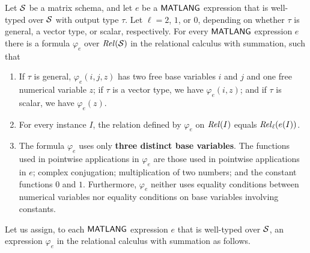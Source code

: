 \begin{proposition} 
Let $\mathcal{S}$ be a matrix schema, and let $e$ be a $\mathsf{MATLANG}$ expression
that is well-typed over $\mathcal{S}$ with output type $\tau$.
Let $\ell=2$, $1$,
or $0$, depending on whether $\tau$ is general, a vector type, or
scalar, respectively.
For every $\mathsf{MATLANG}$ expression $e$ there is a formula
$\varphi_e$ over $\mathit{Rel}(\mathcal{S})$
in the relational calculus with summation, such that
\begin{enumerate}
\item
If\/ $\tau$ is general, $\varphi_e(i,j,z)$ has two free base
variables $i$ and $j$ and one free numerical variable $z$; if\/
$\tau$ is a vector type, we have $\varphi_e(i,z)$; and if\/ $\tau$ is
scalar, we have $\varphi_e(z)$.
\item
For every instance $I$, the relation defined by $\varphi_e$ on
$\mathit{Rel}(I)$ equals $\mathit{Rel}_\ell(e(I))$.
\item
The formula $\varphi_e$ uses only {\bf three distinct base variables}. The functions used in pointwise applications in $\varphi_e$ 
 are those used in
pointwise applications in $e$; complex conjugation;
multiplication of two numbers;
and the constant functions $0$ and $1$.
 Furthermore, $\varphi_e$ neither uses equality conditions between numerical variables nor equality conditions on base variables involving constants.
\end{enumerate}
\end{proposition}


Let us assign, to each $\mathsf{MATLANG}$ expression $e$ that is well-typed over $\mathcal{S}$, an expression $\varphi_e$ in the relational calculus with
summation as follows. 

